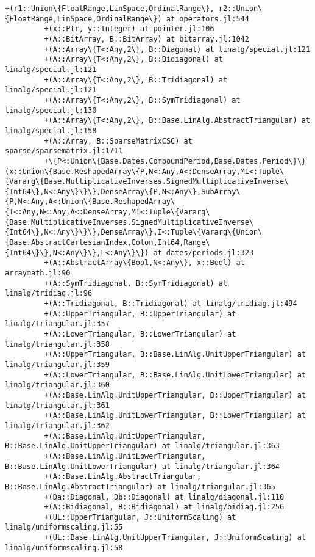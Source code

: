 \documentclass[11pt]{article}
\begin{document}
\begin{Verbatim}[commandchars=\\\{\}]
         +(r1::Union\{FloatRange,LinSpace,OrdinalRange\}, r2::Union\{FloatRange,LinSpace,OrdinalRange\}) at operators.jl:544
         +(x::Ptr, y::Integer) at pointer.jl:106
         +(A::BitArray, B::BitArray) at bitarray.jl:1042
         +(A::Array\{T<:Any,2\}, B::Diagonal) at linalg/special.jl:121
         +(A::Array\{T<:Any,2\}, B::Bidiagonal) at linalg/special.jl:121
         +(A::Array\{T<:Any,2\}, B::Tridiagonal) at linalg/special.jl:121
         +(A::Array\{T<:Any,2\}, B::SymTridiagonal) at linalg/special.jl:130
         +(A::Array\{T<:Any,2\}, B::Base.LinAlg.AbstractTriangular) at linalg/special.jl:158
         +(A::Array, B::SparseMatrixCSC) at sparse/sparsematrix.jl:1711
         +\{P<:Union\{Base.Dates.CompoundPeriod,Base.Dates.Period\}\}(x::Union\{Base.ReshapedArray\{P,N<:Any,A<:DenseArray,MI<:Tuple\{Vararg\{Base.MultiplicativeInverses.SignedMultiplicativeInverse\{Int64\},N<:Any\}\}\},DenseArray\{P,N<:Any\},SubArray\{P,N<:Any,A<:Union\{Base.ReshapedArray\{T<:Any,N<:Any,A<:DenseArray,MI<:Tuple\{Vararg\{Base.MultiplicativeInverses.SignedMultiplicativeInverse\{Int64\},N<:Any\}\}\},DenseArray\},I<:Tuple\{Vararg\{Union\{Base.AbstractCartesianIndex,Colon,Int64,Range\{Int64\}\},N<:Any\}\},L<:Any\}\}) at dates/periods.jl:323
         +(A::AbstractArray\{Bool,N<:Any\}, x::Bool) at arraymath.jl:90
         +(A::SymTridiagonal, B::SymTridiagonal) at linalg/tridiag.jl:96
         +(A::Tridiagonal, B::Tridiagonal) at linalg/tridiag.jl:494
         +(A::UpperTriangular, B::UpperTriangular) at linalg/triangular.jl:357
         +(A::LowerTriangular, B::LowerTriangular) at linalg/triangular.jl:358
         +(A::UpperTriangular, B::Base.LinAlg.UnitUpperTriangular) at linalg/triangular.jl:359
         +(A::LowerTriangular, B::Base.LinAlg.UnitLowerTriangular) at linalg/triangular.jl:360
         +(A::Base.LinAlg.UnitUpperTriangular, B::UpperTriangular) at linalg/triangular.jl:361
         +(A::Base.LinAlg.UnitLowerTriangular, B::LowerTriangular) at linalg/triangular.jl:362
         +(A::Base.LinAlg.UnitUpperTriangular, B::Base.LinAlg.UnitUpperTriangular) at linalg/triangular.jl:363
         +(A::Base.LinAlg.UnitLowerTriangular, B::Base.LinAlg.UnitLowerTriangular) at linalg/triangular.jl:364
         +(A::Base.LinAlg.AbstractTriangular, B::Base.LinAlg.AbstractTriangular) at linalg/triangular.jl:365
         +(Da::Diagonal, Db::Diagonal) at linalg/diagonal.jl:110
         +(A::Bidiagonal, B::Bidiagonal) at linalg/bidiag.jl:256
         +(UL::UpperTriangular, J::UniformScaling) at linalg/uniformscaling.jl:55
         +(UL::Base.LinAlg.UnitUpperTriangular, J::UniformScaling) at linalg/uniformscaling.jl:58

\end{Verbatim}
\end{document}
